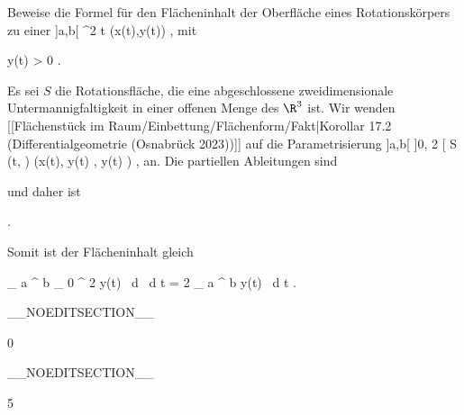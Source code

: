 {

Beweise die Formel für den Flächeninhalt der Oberfläche eines Rotationskörpers zu einer
\maabbeledisp {\gamma} {]a,b[} {\R^2
} { t } {(x(t),y(t))
} {,}
mit

\mavergleichskette
{\vergleichskette
{ y(t)
}
{ > }{ 0
}
{  }{
}
{    }{
}
{   }{
}
}
{}{}{.}

}
{

Es sei $S$ die Rotationsfläche, die eine abgeschlossene zweidimensionale Untermannigfaltigkeit in einer offenen Menge des $\R^3$ ist. Wir wenden
[[Flächenstück im Raum/Einbettung/Flächenform/Fakt|Korollar 17.2 (Differentialgeometrie (Osnabrück 2023))]]
auf die Parametrisierung
\maabbeledisp {} { ]a,b[ \times ]0, 2 \pi[} {S
} { (t, \alpha) } { (x(t),  y(t) \cos \alpha  , y(t) \sin \alpha  )
} {,}
an. Die partiellen Ableitungen sind

 {  }

und daher ist

 { . }

Somit ist der Flächeninhalt gleich

\mavergleichskettedisphandlinks
{\vergleichskettedisphandlinks
{ \int_{  a  }^{  b  } \int_{  0  }^{  2 \pi }  \cdot   y(t) \, d \alpha \, d t
}
{ =} { 2 \pi \int_{  a  }^{  b  }  \cdot   y(t) \, d t
}
{ } {
}
{ } {
}
{ } {
}
}
{}{}{.}

 }

__NOEDITSECTION__

{0}

{

}
{  }

__NOEDITSECTION__

{5}

